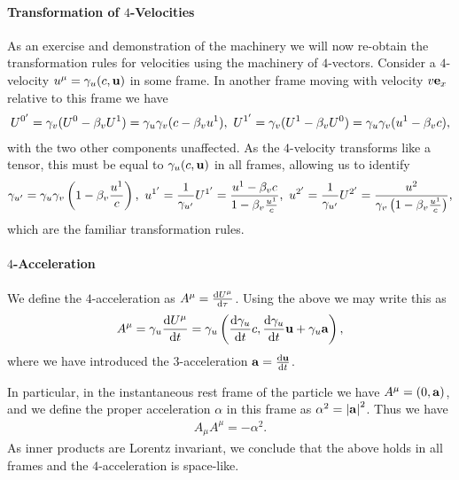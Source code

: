 \paragraph{Transformation of $4$-Velocities}
As an exercise and demonstration of the machinery we will now re-obtain the transformation rules for velocities using the machinery of $4$-vectors. Consider a $4$-velocity $u^{\mu} = \gamma_{u}(c, \vb{u})$ in some frame. In another frame moving with velocity $v\vb{e}_{x}$ relative to this frame we have
\begin{align*}
	U^{0^{\prime}} = \gamma_{v}(U^{0} - \beta_{v}U^{1}) = \gamma_{u}\gamma_{v}(c - \beta_{v}u^{1}),\ U^{1^{\prime}} = \gamma_{v}(U^{1} - \beta_{v}U^{0}) = \gamma_{u}\gamma_{v}(u^{1} - \beta_{v}c),
\end{align*}
with the two other components unaffected. As the $4$-velocity transforms like a tensor, this must be equal to $\gamma_{u}(c, \vb{u})$ in all frames, allowing us to identify
\begin{align*}
	\gamma_{u^{\prime}} = \gamma_{u}\gamma_{v}\left(1 - \beta_{v}\frac{u^{1}}{c}\right),\ u^{1^{\prime}} = \frac{1}{\gamma_{u^{\prime}}}U^{1^{\prime}} = \frac{u^{1} - \beta_{v}c}{1 - \beta_{v}\frac{u^{1}}{c}},\ u^{2^{\prime}} = \frac{1}{\gamma_{u^{\prime}}}U^{2^{\prime}} = \frac{u^{2}}{\gamma_{v}\left(1 - \beta_{v}\frac{u^{1}}{c}\right)},
\end{align*}
which are the familiar transformation rules.

\paragraph{$4$-Acceleration}
We define the $4$-acceleration as $A^{\mu} = \dv{U^{\mu}}{\tau}$. Using the above we may write this as
\begin{align*}
	A^{\mu} = \gamma_{u}\dv{U^{\mu}}{t} = \gamma_{u}\left(\dv{\gamma_{u}}{t}c, \dv{\gamma_{u}}{t}\vb{u} + \gamma_{u}\vb{a}\right),
\end{align*}
where we have introduced the $3$-acceleration $\vb{a} = \dv{\vb{u}}{t}$.

In particular, in the instantaneous rest frame of the particle we have $A^{\mu} = (0, \vb{a})$, and we define the proper acceleration $\alpha$ in this frame as $\alpha^{2} = \abs{\vb{a}}^{2}$. Thus we have
\begin{align*}
	A_{\mu}A^{\mu} = -\alpha^{2}.
\end{align*}
As inner products are Lorentz invariant, we conclude that the above holds in all frames and the $4$-acceleration is space-like.

